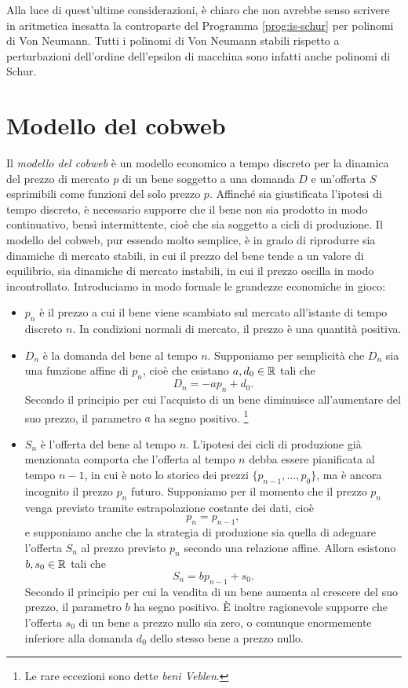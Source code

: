 Alla luce di quest'ultime considerazioni, è chiaro che non avrebbe
senso scrivere in aritmetica inesatta la controparte del
Programma \ref{prog:is-schur} per polinomi di Von Neumann.
Tutti i polinomi di Von Neumann stabili rispetto a perturbazioni
dell'ordine dell'epsilon di macchina sono infatti anche polinomi di Schur.

\section{Modello del cobweb}

Il \emph{modello del cobweb} è un modello economico a tempo discreto
per la dinamica del prezzo di mercato $p$ di un bene soggetto a una
domanda $D$ e un'offerta $S$ esprimibili come funzioni
del solo prezzo $p$.
Affinché sia giustificata l'ipotesi di tempo discreto,
è necessario supporre che il bene non sia prodotto in modo continuativo,
bensì intermittente, cioè che sia soggetto a cicli di produzione.
Il modello del cobweb, pur essendo molto semplice, è in grado di riprodurre
sia dinamiche di mercato stabili, in cui il prezzo del bene tende a un valore
di equilibrio, sia dinamiche di mercato instabili, in cui il prezzo oscilla
in modo incontrollato.
Introduciamo in modo formale le grandezze economiche in gioco:
\begin{itemize}
\item $p_n$ è il prezzo a cui il bene viene scambiato sul mercato
	all'istante di tempo discreto $n$.
	In condizioni normali di mercato, il prezzo è una quantità positiva.
\item $D_n$ è la domanda del bene al tempo $n$.
	Supponiamo per semplicità che $D_n$ sia una funzione affine di $p_n$,
	cioè che esistano $a, d_0 \in \mathbb{R}$ tali che
	\[
	D_n = -a p_n + d_0.
	\]
	Secondo il principio per cui l'acquisto di un bene diminuisce
	all'aumentare del suo prezzo, il parametro $a$ ha segno positivo.%
	\footnote{Le rare eccezioni sono dette \emph{beni Veblen}.}
\item $S_n$ è l'offerta del bene al tempo $n$.
	L'ipotesi dei cicli di produzione già menzionata comporta
	che l'offerta al tempo $n$ debba essere pianificata al tempo $n-1$,
	in cui è noto lo storico dei prezzi $\{p_{n-1},\dots,p_0\}$,
	ma è ancora incognito il prezzo $p_n$ futuro.
	Supponiamo per il momento che il prezzo $p_n$ venga previsto tramite
	estrapolazione costante dei dati, cioè
	\[
	p_n = p_{n-1},
	\]
	e supponiamo anche che la strategia di produzione sia quella
	di adeguare l'offerta $S_n$ al prezzo previsto $p_n$ secondo
	una relazione affine. Allora esistono $b, s_0 \in \mathbb{R}$ tali che
	\[
	S_n = b p_{n-1} + s_0.
	\]
	Secondo il principio per cui la vendita di un bene aumenta
	al crescere del suo prezzo, il parametro $b$ ha segno positivo.
	È inoltre ragionevole supporre che l'offerta $s_0$ di un bene
	a prezzo nullo sia zero, o comunque enormemente inferiore alla domanda
	$d_0$ dello stesso bene a prezzo nullo.
\end{itemize}
